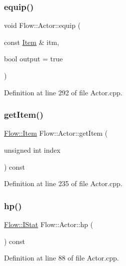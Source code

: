 \subsubsection{\texorpdfstring{equip()}{equip()}\hspace{0.1cm}{\footnotesize\ttfamily [2/2]}}
{\footnotesize\ttfamily void Flow\+::\+Actor\+::equip (\begin{DoxyParamCaption}\item[{const \hyperlink{class_flow_1_1_item}{Item} \&}]{itm,  }\item[{bool}]{output = {\ttfamily true} }\end{DoxyParamCaption})}



Definition at line 292 of file Actor.\+cpp.

\hypertarget{class_flow_1_1_actor_ae7bcb5a227abb90a6850f15ec9cdd1e7}{}\label{class_flow_1_1_actor_ae7bcb5a227abb90a6850f15ec9cdd1e7} 
\subsubsection{\texorpdfstring{get\+Item()}{getItem()}}
{\footnotesize\ttfamily \hyperlink{class_flow_1_1_item}{Flow\+::\+Item} Flow\+::\+Actor\+::get\+Item (\begin{DoxyParamCaption}\item[{unsigned int}]{index }\end{DoxyParamCaption}) const}



Definition at line 235 of file Actor.\+cpp.

\hypertarget{class_flow_1_1_actor_aaea76048a01d31bfc82a0eeb53c5cbdb}{}\label{class_flow_1_1_actor_aaea76048a01d31bfc82a0eeb53c5cbdb} 
\subsubsection{\texorpdfstring{hp()}{hp()}}
{\footnotesize\ttfamily \hyperlink{class_flow_1_1_i_stat}{Flow\+::\+I\+Stat} Flow\+::\+Actor\+::hp (\begin{DoxyParamCaption}{ }\end{DoxyParamCaption}) const}



Definition at line 88 of file Actor.\+cpp.

